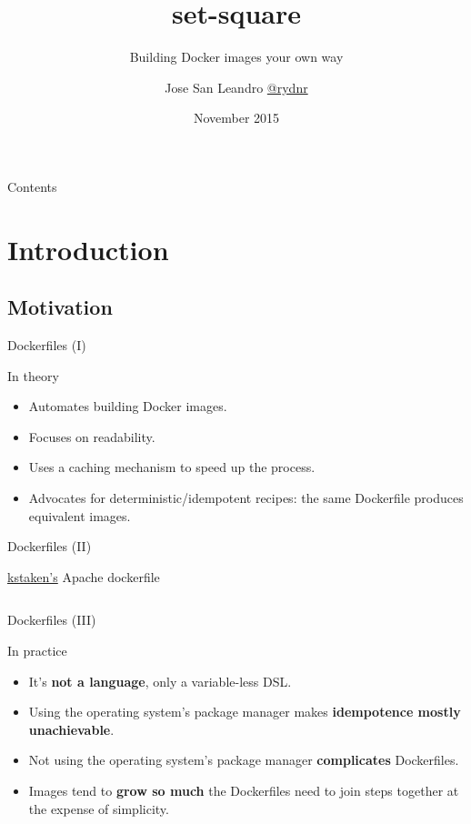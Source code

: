 \documentclass{beamer}
\title{set-square}
\subtitle{Building Docker images your own way}
\author{Jose San Leandro \href{http://twitter.com/rydnr}{@rydnr}}
\institute[OSOCO]{%
  \href{http://www.osoco.es}{OSOCO}
}
\date[11/2015]{November 2015}
\begin{document}
\begin{frame}[plain]
  \titlepage
\end{frame}

\begin{frame}[plain]{Contents}
  \tableofcontents[hideallsubsections]
\end{frame}

\section{Introduction}

\subsection{Motivation}

\begin{frame}{Dockerfiles (I)}
		\begin{exampleblock}{In theory}
			\begin{itemize}
        \item Automates building Docker images.
        \item Focuses on readability.
        \item Uses a caching mechanism to speed up the process.
        \item Advocates for deterministic/idempotent recipes: the same Dockerfile produces equivalent images.
			\end{itemize}
		\end{exampleblock}
\end{frame}

\begin{frame}{Dockerfiles (II)}
  \begin{block}{\href{https://github.com/kstaken/dockerfile-examples/blob/master/apache/Dockerfile}{kstaken's} Apache dockerfile}
    \inputminted[fontsize=\small]{bash}{apache.dockerfile}
  \end{block}
\end{frame}

\begin{frame}{Dockerfiles (III)}
		\begin{alertblock}{In practice}
			\begin{itemize}
        \item It's \textbf{not a language}, only a variable-less DSL.
        \item Using the operating system's package manager makes \textbf{idempotence mostly unachievable}.
        \item Not using the operating system's package manager \textbf{complicates} Dockerfiles.
        \item Images tend to \textbf{grow so much} the Dockerfiles need to
          join steps together at the expense of simplicity.
			\end{itemize}
		\end{alertblock}
\end{frame}
\end{document}
